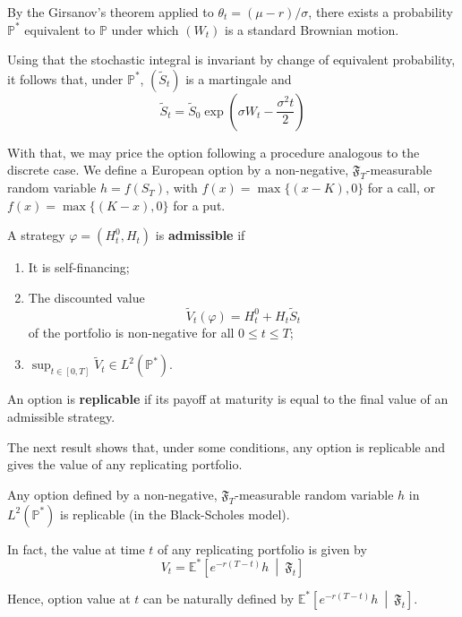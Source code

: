 By the Girsanov's theorem applied to $\theta_t = (\mu-r)/\sigma$, there exists a probability $\mathbb{P}^\ast$ equivalent to $\mathbb{P}$ under which $(W_t)$ is a standard Brownian motion. 

Using that the stochastic integral is invariant by change of equivalent probability, it follows that, under $\mathbb{P}^\ast$, $(\tilde{S}_t)$ is a martingale and 
\[
    \tilde{S}_t = \tilde{S}_0 \exp \left(\sigma W_t - \frac{\sigma^2 t}{2} \right)
\]

With that, we may price the option following a procedure analogous to the discrete case. We define a European option by a non-negative, $\mathfrak{F}_T$-measurable random variable $h = f(S_T)$, with $f(x) = \max \{(x - K), 0 \}$ for a call, or $f(x) = \max \{(K-x), 0 \}$ for a put.

\begin{definition}
    A strategy $\varphi = (H_t^0, H_t)$ is \textbf{admissible} if 
    \begin{enumerate}
        \item It is self-financing;
        \item The discounted value $$\tilde{V}_t(\varphi) = H_t^0 + H_t \tilde{S}_t$$ of the portfolio is non-negative for all $0 \le t \le T$;
        \item $\sup_{t \in [0, T]} \tilde{V}_t \in L^2(\mathbb{P}^\ast)$.
    \end{enumerate}

    An option is \textbf{replicable} if its payoff at maturity is equal to the final value of an admissible strategy.
\end{definition}

The next result shows that, under some conditions, any option is replicable and gives the value of any replicating portfolio.

\begin{theorem}
    Any option defined by a non-negative, $\mathfrak{F}_T$-measurable random variable $h$ in $L^2(\mathbb{P}^\ast)$ is replicable (in the Black-Scholes model).
    
    In fact, the value at time $t$ of any replicating portfolio is given by 
    $$
        V_t = \mathbb{E}^\ast \left[ e^{-r(T-t)} h ~ \middle| ~ \mathfrak{F}_t \right]
    $$
\end{theorem}

Hence, option value at $t$ can be naturally defined by $\mathbb{E}^\ast \left[ e^{-r(T-t)} h ~ \middle| ~ \mathfrak{F}_t \right]$.

